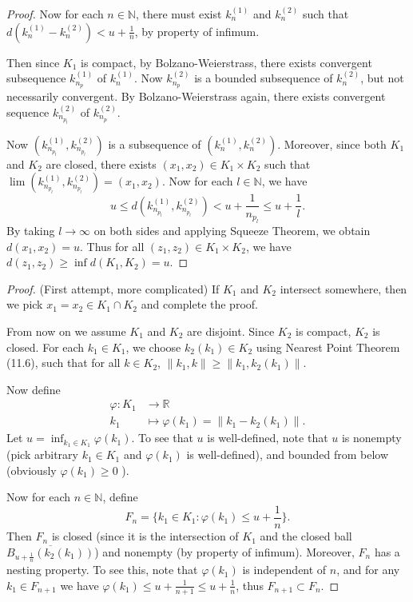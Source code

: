 \begin{enumerate}
\begin{proof}
	Now for each $n \in \mathbb{N}$, there must exist $k_n^{(1)}$ and $k_n^{(2)}$ such that $d(k^{(1)}_n- k^{(2)}_n) < u + \frac{1}{n}$, by property of infimum. 

	Then since $K_1$ is compact, by Bolzano-Weierstrass, there exists convergent subsequence $k_{n_p}^{(1)}$ of $k_n^{(1)}$. Now $k_{n_p}^{(2)}$ is a bounded subsequence of $k_n^{(2)}$, but not necessarily convergent. By Bolzano-Weierstrass again, there exists convergent sequence $k_{n_{p_l}}^{(2)}$ of $k_{n_p}^{(2)}$.

	Now $(k_{n_{p_l}}^{(1)}, k_{n_{p_l}}^{(2)})$ is a subsequence of $\left( k_n^{(1)}, k_{n}^{(2)} \right) $. 
	Moreover, since both $K_1 $ and $K_2$ are closed, there exists $(x_1, x_2) \in K_1 \times K_2$ such that $\lim ( k_{n_{p_l}}^{(1)}, k_{n_{p_l}}^{(2)}) = (x_1, x_2) $. 
	Now for each $l \in \mathbb{N}$, we have
	\[
		u \le d( k_{n_{p_l}}^{(1)}, k_{n_{p_l}}^{(2)}) < u + \frac{1}{n_{p_l}} \le u + \frac{1}{l} 
	.\] 
	By taking $l \to \infty $ on both sides and applying Squeeze Theorem, we obtain
	$d(x_1, x_2) = u$. Thus for all $(z_1, z_2) \in K_1 \times K_2$, we have $d(z_1, z_2)\ge \operatorname{inf} d(K_1, K_2) = u$.
	
\end{proof}

\begin{proof}
	(First attempt, more complicated)
	If $K_1$ and $K_2$ intersect somewhere, then we pick $x_1 = x_2 \in K_1 \cap K_2$ and complete the proof.

	From now on we assume $K_1$ and $K_2$ are disjoint. Since $K_2$ is compact, $K_2$ is closed.
	For each $k_1 \in K_1$, we choose $k_2(k_1) \in K_2$ using Nearest Point Theorem (11.6), such that for all $k \in K_2$, $\|k_1, k\| \ge \|k_1, k_2(k_1)\|$.

	Now define \begin{align*}
		\varphi: K_1 &\longrightarrow \mathbb{R} \\
		k_1 &\longmapsto \varphi(k_1) = \|k_1 - k_2(k_1)\|
	.\end{align*}
	Let $u = \operatorname{inf}_{k_1 \in K_1}\varphi(k_1)$. To see that $u$ is well-defined, note that $u$ is nonempty (pick arbitrary $k_1 \in K_1$ and $\varphi(k_1)$ is well-defined), and bounded from below (obviously  $\varphi(k_1)\ge 0$ ). 

	Now for each $n \in \mathbb{N}$, define
	\[
		F_n = \{k_1 \in K_1: \varphi(k_1) \le  u + \frac{1}{n}\} 
	.\] 
	Then $F_n$ is closed (since it is the intersection of $K_1$ and the closed ball $\overline{B_{u+\frac{1}{n}}\left( k_2(k_1) \right) } $\quad ) and nonempty (by property of infimum). Moreover, $F_n$ has a nesting property. To see this, note that $\varphi(k_1)$ is independent of $n$, and for any $k_1 \in F_{n+1}$ we have $\varphi(k_1)\le u + \frac{1}{n+1} \le u + \frac{1}{n}$, thus $F_{n+1} \subset F_n$.


\end{proof}
\end{enumerate}
